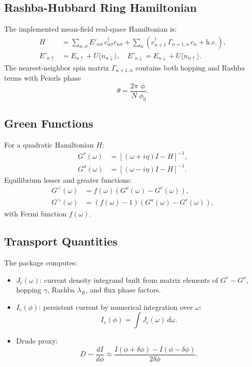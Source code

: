 \documentclass[11pt,a4paper]{article}
\begin{document}
\subsection{Rashba-Hubbard Ring Hamiltonian}
The implemented mean-field real-space Hamiltonian is:
\begin{align}
H &= \sum_{n,\sigma} E'_{n\sigma}\, c^\dagger_{n\sigma} c_{n\sigma}
 + \sum_n \left(c^\dagger_{n+1}\,\Gamma_{n+1,n}\,c_n + \mathrm{h.c.}\right),\\
E'_{n\uparrow} &= E_{n\uparrow} + U\langle n_{n\downarrow}\rangle,\quad
E'_{n\downarrow} = E_{n\downarrow} + U\langle n_{n\uparrow}\rangle.
\end{align}
The nearest-neighbor spin matrix \(\Gamma_{n+1,n}\) contains both hopping and Rashba terms with Peierls phase
\[
\theta = \frac{2\pi}{N}\frac{\phi}{\phi_0}.
\]

\subsection{Green Functions}
For a quadratic Hamiltonian \(H\):
\begin{align}
G^r(\omega) &= \left[(\omega + i\eta)I - H\right]^{-1},\\
G^a(\omega) &= \left[(\omega - i\eta)I - H\right]^{-1}.
\end{align}
Equilibrium lesser and greater functions:
\begin{align}
G^<(\omega) &= f(\omega)\left(G^a(\omega)-G^r(\omega)\right),\\
G^>(\omega) &= \left(f(\omega)-1\right)\left(G^a(\omega)-G^r(\omega)\right),
\end{align}
with Fermi function \(f(\omega)\).

\subsection{Transport Quantities}
The package computes:
\begin{itemize}[leftmargin=1.5em]
  \item \(J_c(\omega)\): current density integrand built from matrix elements of \(G^r-G^a\), hopping \(\gamma\), Rashba \(\lambda_R\), and flux phase factors.
  \item \(I_c(\phi)\): persistent current by numerical integration over \(\omega\):
  \[
  I_c(\phi)=\int J_c(\omega)\,d\omega.
  \]
  \item Drude proxy:
  \[
  D \sim \frac{dI}{d\phi}\approx\frac{I(\phi+\delta\phi)-I(\phi-\delta\phi)}{2\delta\phi}.
  \]
\end{itemize}
\end{document}
